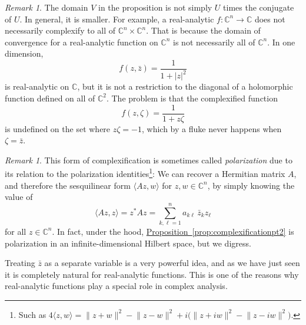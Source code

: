 \documentclass[12pt,openany]{book}
\newcommand{\linnprod}[2]{\langle #1 , #2 \rangle}
\newcommand{\sabs}[1]{\lvert {#1} \rvert}
\newcommand{\snorm}[1]{\lVert {#1} \rVert}
\newcommand{\C}{{\mathbb{C}}}
\newcommand{\myindex}[1]{#1\index{#1}}
\theoremstyle{plain}
\theoremstyle{remark}
\newtheorem{remark}[thm]{Remark}
\theoremstyle{definition}
\theoremstyle{exercise}
\theoremstyle{example}
\newcommand{\propref}[1]{\hyperref[#1]{Proposition~\ref*{#1}}}
\begin{document}
\begin{remark}
The domain $V$ in the proposition is not simply $U$ times the conjugate of $U$.
In general, it is smaller.  For example, a real-analytic $f \colon \C^n \to
\C$ does not necessarily complexify to all of $\C^n \times \C^n$.
That is
because the domain of convergence for a real-analytic function on $\C^n$
is not necessarily all of $\C^n$.  In one dimension,
\begin{equation*}
f(z,\bar{z})
= \frac{1}{1+\sabs{z}^2}
\end{equation*}
is real-analytic on $\C$, but it is not a restriction to the diagonal
of a holomorphic function defined on all of $\C^2$.  The problem is that the complexified
function
\begin{equation*}
f(z,\zeta)
= \frac{1}{1+z \zeta}
\end{equation*}
is undefined on the set where $z \zeta = -1$, which by a fluke
never happens when $\zeta = \bar{z}$.
\end{remark}

\begin{remark}
This form of complexification is sometimes called
\emph{\myindex{polarization}} due to its relation to the polarization
identities\footnote{Such as $4 \linnprod{z}{w} =
\snorm{z+w}^2-\snorm{z-w}^2 +i \bigl( \snorm{z+iw}^2 - \snorm{z-iw}^2
\bigr)$.}:  We can recover a Hermitian matrix $A$,
and therefore the sesquilinear form $\linnprod{Az}{w}$ for
$z,w\in \C^n$, by simply knowing the value of
\begin{equation*}
\linnprod{Az}{z} = z^*Az = \sum_{k,\ell=1}^n a_{k\ell} \, \bar{z}_k z_\ell
\end{equation*}
for all $z \in \C^n$.  In fact, under the hood, \propref{prop:complexificationpt2} is
polarization in an infinite-dimensional Hilbert space, but we digress.
\end{remark}

Treating $\bar{z}$ as a separate variable is a very powerful idea, and
as we have just seen it is completely natural for
real-analytic functions.  This is one of the reasons why real-analytic
functions play a special role in complex analysis.
\end{document}
